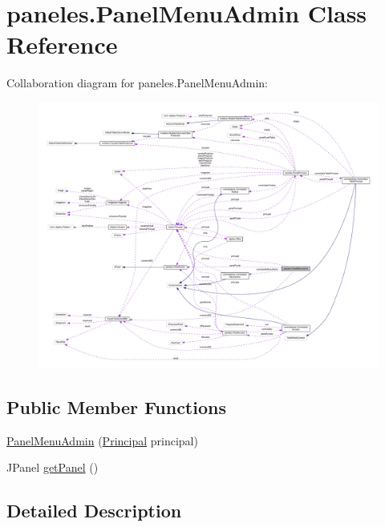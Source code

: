 \hypertarget{classpaneles_1_1_panel_menu_admin}{}\section{paneles.\+Panel\+Menu\+Admin Class Reference}
\label{classpaneles_1_1_panel_menu_admin}


Collaboration diagram for paneles.\+Panel\+Menu\+Admin\+:\nopagebreak
\begin{figure}[H]
\begin{center}
\leavevmode
\includegraphics[width=350pt]{classpaneles_1_1_panel_menu_admin__coll__graph}
\end{center}
\end{figure}
\subsection*{Public Member Functions}
\begin{DoxyCompactItemize}
\item 
\mbox{\hyperlink{classpaneles_1_1_panel_menu_admin_ae686f35c694b90e334b64c385aa959ee}{Panel\+Menu\+Admin}} (\mbox{\hyperlink{classvistas_1_1_principal}{Principal}} principal)
\item 
J\+Panel \mbox{\hyperlink{classpaneles_1_1_panel_menu_admin_a45a3165ede4cd4e1d926a7d07cedc8a1}{get\+Panel}} ()
\end{DoxyCompactItemize}


\subsection{Detailed Description}


